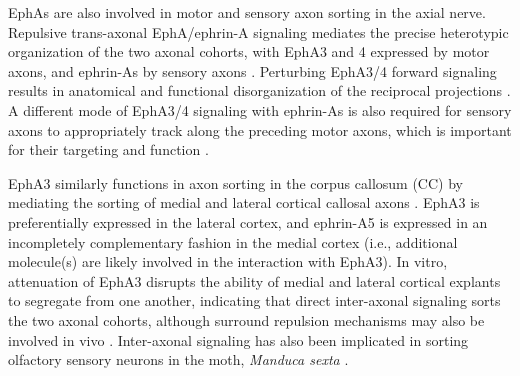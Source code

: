 EphAs are also involved in motor and sensory axon sorting in the axial nerve.
Repulsive trans-axonal EphA/ephrin-A signaling mediates the precise heterotypic organization of the two axonal cohorts, with EphA3 and 4 expressed by motor axons, and ephrin-As by sensory axons \cite{gallarda2008segregation}.
Perturbing EphA3/4 forward signaling results in anatomical and functional disorganization of the reciprocal projections \cite{gallarda2008segregation}.
A different mode of EphA3/4 signaling with ephrin-As is also required for sensory axons to appropriately track along the preceding motor axons, which is important for their targeting and function \cite{wang2011anatomical}.

EphA3 similarly functions in axon sorting in the corpus callosum (CC) by mediating the sorting of medial and lateral cortical callosal axons \cite{nishikimi2011segregation}.
EphA3 is preferentially expressed in the lateral cortex, and ephrin-A5 is expressed in an incompletely complementary fashion in the medial cortex (i.e., additional molecule(s) are likely involved in the interaction with EphA3).
In vitro, attenuation of EphA3 disrupts the ability of medial and lateral cortical explants to segregate from one another, indicating that direct inter-axonal signaling sorts the two axonal cohorts, although surround repulsion mechanisms may also be involved in vivo \cite{nishikimi2011segregation}.
Inter-axonal signaling has also been implicated in sorting olfactory sensory neurons in the moth, \emph{Manduca sexta} \cite{kaneko2003interaxonal}.

